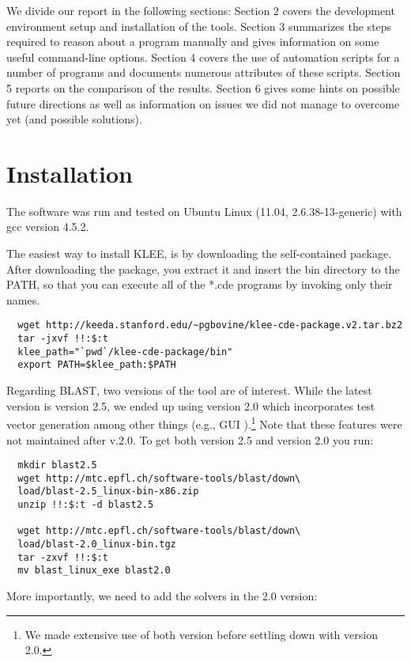 \documentclass[a4paper, 11pt,twoside]{article}
\begin{document}
We divide our report in the following sections: Section 2 covers the development environment setup and installation of the tools. Section 3 summarizes the steps required to reason about a program manually and gives information on some useful command-line options. Section 4 covers the use of automation scripts for a number of programs and documents numerous attributes of these scripts. Section 5 reports on the comparison of the results. Section 6 gives some hints on possible future directions as well as information on issues we did not manage to overcome yet (and possible solutions).
\\

\section{Installation}
The software was run and tested on Ubuntu Linux (11.04, 2.6.38-13-generic) with gcc version 4.5.2. 

The easiest way to install KLEE, is by downloading the self-contained package. After downloading the package, you extract it and insert the bin directory to the PATH, so that you can execute all of the *.cde programs by invoking only their names.

\begin{verbatim} 
  wget http://keeda.stanford.edu/~pgbovine/klee-cde-package.v2.tar.bz2
  tar -jxvf !!:$:t
  klee_path="`pwd`/klee-cde-package/bin"
  export PATH=$klee_path:$PATH
\end{verbatim}

Regarding BLAST, two versions of the tool are of interest. While the latest version is version 2.5, we ended up using version 2.0 which incorporates test vector generation among other things (e.g., GUI ).\footnote{We made extensive use of both version before settling down with version 2.0.} Note that these features were not maintained after v.2.0. To get both version 2.5 and version 2.0 you run:

\begin{verbatim} 
  mkdir blast2.5
  wget http://mtc.epfl.ch/software-tools/blast/down\
  load/blast-2.5_linux-bin-x86.zip
  unzip !!:$:t -d blast2.5

  wget http://mtc.epfl.ch/software-tools/blast/down\
  load/blast-2.0_linux-bin.tgz
  tar -zxvf !!:$:t
  mv blast_linux_exe blast2.0
\end{verbatim}

More importantly, we need to add the solvers in the 2.0 version:
\end{document}
